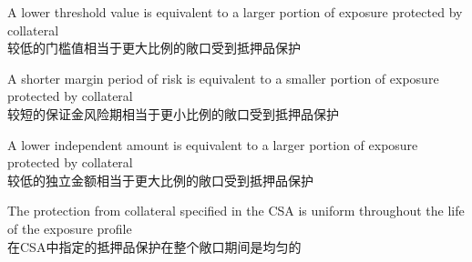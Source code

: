 \documentclass{article}
\begin{document}
\begin{choices}
    \item A lower threshold value is equivalent to a larger portion of exposure protected by collateral\\
    较低的门槛值相当于更大比例的敞口受到抵押品保护
    \item A shorter margin period of risk is equivalent to a smaller portion of exposure protected by collateral\\
    较短的保证金风险期相当于更小比例的敞口受到抵押品保护
    \item A lower independent amount is equivalent to a larger portion of exposure protected by collateral\\
    较低的独立金额相当于更大比例的敞口受到抵押品保护
    \item The protection from collateral specified in the CSA is uniform throughout the life of the exposure profile\\
    在CSA中指定的抵押品保护在整个敞口期间是均匀的
\end{choices}
\end{document}
